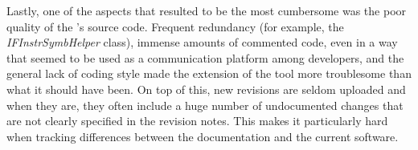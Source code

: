 Lastly, one of the aspects that resulted to be the most cumbersome was the poor quality of the \spf{}'s source code. Frequent redundancy (for example, the \textit{IFInstrSymbHelper} class), immense amounts of commented code, even in a way that seemed to be used as a communication platform among developers, and the general lack of coding style made the extension of the tool more troublesome than what it should have been. On top of this, new revisions are seldom uploaded and when they are, they often include a huge number of undocumented changes that are not clearly specified in the revision notes. This makes it particularly hard when tracking differences between the documentation and the current software.